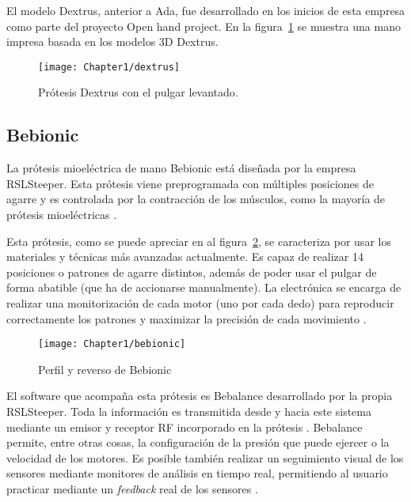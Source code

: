 El modelo Dextrus, anterior a Ada, fue desarrollado en los inicios de esta
empresa
como parte del proyecto Open hand project. En la figura~\ref{fig:dextrus} se
muestra
una mano impresa basada en los modelos 3D Dextrus.


\begin{figure}[htp]
  \centering
    \texttt{[image: Chapter1/dextrus]}
  \caption{Prótesis Dextrus con el pulgar levantado.}
\label{fig:dextrus}
\end{figure}



\subsection{Bebionic}
\label{sub:bebionic}

La prótesis mioeléctrica de mano Bebionic está diseñada por la empresa
RSLSteeper.
Esta prótesis viene preprogramada con múltiples posiciones de agarre y es
controlada
por la contracción de los músculos, como la mayoría de prótesis mioeléctricas
\cite{medynski2011bebionic}.

Esta prótesis, como se puede apreciar en al figura~\ref{fig:bebionic}, se
caracteriza por usar los materiales y técnicas más avanzadas actualmente. Es capaz de
realizar 14 posiciones o patrones de agarre distintos, además de poder usar el
pulgar de forma abatible (que ha de accionarse manualmente). La electrónica se
encarga de realizar una monitorización de cada motor (uno por cada dedo) para
reproducir correctamente los patrones y maximizar la precisión de cada
movimiento \cite{medynski2011bebionic}.


\begin{figure}[htp]
  \centering
    \texttt{[image: Chapter1/bebionic]}
  \caption{Perfil y reverso de Bebionic}
\label{fig:bebionic}
\end{figure}


El software que acompaña esta prótesis es Bebalance desarrollado por la propia
RSLSteeper. Toda la información es transmitida desde y hacia este sistema
mediante un emisor y receptor RF incorporado en la prótesis
\cite{waryck2011comparison}.
Bebalance permite, entre otras cosas, la configuración de la presión que puede
ejercer o la velocidad de los motores. Es posible también realizar un
seguimiento visual de los sensores mediante monitores de análisis en tiempo
real, permitiendo al usuario practicar mediante un \textit{feedback} real de
los sensores \cite{medynski2011bebionic}.

